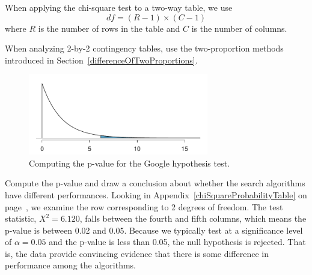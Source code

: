 \begin{termBox}{
When applying the chi-square test to a two-way table, we use
$$ df = (R-1)\times (C-1) $$
where $R$ is the number of rows in the table and $C$ is the number of columns.}
\end{termBox}

\begin{tipBox}{
When analyzing 2-by-2 contingency tables, use the two-proportion methods introduced in Section~\ref{differenceOfTwoProportions}.}
\end{tipBox}

\begin{figure}[h]
\centering
\includegraphics[width=0.7\textwidth]{ch_inference_for_props/figures/googleHTForDiffAlgPerformancePValue/googleHTForDiffAlgPerformancePValue}
\caption{Computing the p-value for the Google hypothesis test.}
\label{googleHTForDiffAlgPerformancePValue}
\end{figure}

\begin{example}{Compute the p-value and draw a conclusion about whether the search algorithms have different performances.}
Looking in Appendix~\ref{chiSquareProbabilityTable} on page~\pageref{chiSquareProbabilityTable}, we examine the row corresponding to 2 degrees of freedom. The test statistic, $X^2=6.120$, falls between the fourth and fifth columns, which means the p-value is between 0.02 and 0.05. Because we typically test at a significance level of $\alpha=0.05$ and the p-value is less than 0.05, the null hypothesis is rejected. That is, the data provide convincing evidence that there is some difference in performance among the algorithms.
\end{example}


